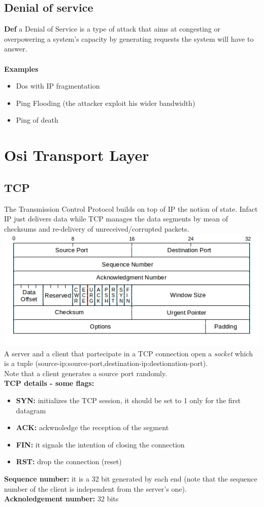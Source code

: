 \documentclass[10pt,a4paper]{book}
\begin{document}
\section{Denial of service}
\textbf{Def} a Denial of Service is a type of attack that aims at congesting or overpowering a system's capacity by generating requests the system will have to answer.\\\\
\textbf{Examples}
\begin{itemize}
\item Dos with IP fragmentation
\item Ping Flooding (the attacker exploit his wider bandwidth)
\item Ping of death
\end{itemize}
\chapter{Osi Transport Layer}
\section{TCP}
The Transmission Control Protocol builds on top of IP the notion of state. Infact IP just delivers data while TCP manages the data segments by mean of checksums and re-delivery of unreceived/corrupted packets.\\
\includegraphics[scale=0.8]{tcp-header.png}\\
A server and a client that partecipate in a TCP connection open a \emph{socket} which is a tuple (source-ip:source-port,destination-ip:destionation-port).\\
Note that a client generates a source port randomly.\\
\textbf{TCP details - some flags:}
\begin{itemize}
\item \textbf{SYN:} initializes the TCP session, it should be set to 1 only for the first datagram
\item \textbf{ACK:} ackwnoledge the reception of the segment
\item \textbf{FIN:} it signals the intention of closing the connection
\item \textbf{RST:} drop the connection (reset)
\end{itemize}
\textbf{Sequence number:} it is a 32 bit generated by each end (note that the sequence number of the client is independent from the server's one).\\
\textbf{Acknoledgement number:} 32 bits\\\\
\newpage
\end{document}
